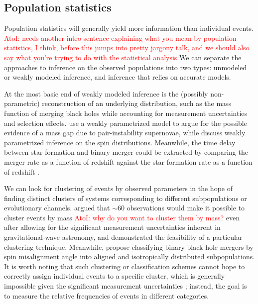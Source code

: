\documentclass[iop,onecolumn]{revtex4}
\newcommand{\ajf}[1]{\textcolor{red}{AtoI: #1}}
\begin{document}
\subsection{Population statistics}
Population statistics will generally yield more information than individual events. \ajf{needs another intro sentence explaining what you mean by population statistics, I think, before this jumps into pretty jargony talk, and we should also say what you're trying to do with the statistical analysis} We can separate the approaches to inference on the observed populations into two types: unmodeled or weakly modeled inference, and inference that relies on accurate models. 

At the most basic end of weakly modeled inference is the (possibly non-parametric) reconstruction of an underlying distribution, such as the mass function of merging black holes \citep{Mandel:2010stat,BBH:O1} while accounting for measurement uncertainties and selection effects.  \citet{Fishbach:2017mass} use a weakly parametrized model to argue for the possible evidence of a mass gap due to pair-instability supernovae, while \citet{TalbotThrane:2017} discuss weakly parametrized inference on the spin distributions.  Meanwhile, the time delay between star formation and binary merger could be extracted by comparing the merger rate as a function of redshift against the star formation rate as a function of redshift \citep{Mandel:2016select}.  

We can look for clustering of events by observed parameters in the hope of finding distinct clusters of systems corresponding to different subpopulations or evolutionary channels.  \citet{Mandel:2015} argued that $\sim 60$ observations would make it possible to cluster events by mass \ajf{why do you want to cluster them by mass?} even after allowing for the significant measurement uncertainties inherent in gravitational-wave astronomy, and \citet{Mandel:2016cluster} demonstrated the feasibility of a particular clustering technique.  Meanwhile, \citet{Farr:2018} propose classifying binary black hole mergers by spin misalignment angle into aligned and isotropically distributed subpopulations.  It is worth noting that such clustering or classification schemes cannot hope to correctly assign individual events to a specific cluster, which is generally impossible given the significant measurement uncertainties \citep{Littenberg:2015}; instead, the goal is to measure the relative frequencies of events in different categories.
\end{document}

